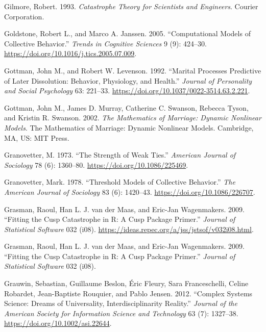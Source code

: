 \documentclass[
  letterpaper,
]{scrbook}
\newlength{\cslhangindent}
\newlength{\cslentryspacingunit} %
\newenvironment{CSLReferences}[2] %
 {%
  \setlength{\parindent}{0pt}
  \ifodd #1
  \let\oldpar\par
  \def\par{\hangindent=\cslhangindent\oldpar}
  \fi
  \setlength{\parskip}{#2\cslentryspacingunit}
 }%
 {}
\begin{document}
\begin{CSLReferences}{1}{0}
\leavevmode{}%
Gilmore, Robert. 1993. \emph{Catastrophe {Theory} for {Scientists} and
{Engineers}}. {Courier Corporation}.

\leavevmode{}%
Goldstone, Robert L., and Marco A. Janssen. 2005. {``Computational
Models of Collective Behavior.''} \emph{Trends in Cognitive Sciences} 9
(9): 424--30. \url{https://doi.org/10.1016/j.tics.2005.07.009}.

\leavevmode{}%
Gottman, John M., and Robert W. Levenson. 1992. {``Marital Processes
Predictive of Later Dissolution: {Behavior}, Physiology, and Health.''}
\emph{Journal of Personality and Social Psychology} 63: 221--33.
\url{https://doi.org/10.1037/0022-3514.63.2.221}.

\leavevmode{}%
Gottman, John M., James D. Murray, Catherine C. Swanson, Rebecca Tyson,
and Kristin R. Swanson. 2002. \emph{The Mathematics of Marriage:
{Dynamic} Nonlinear Models}. The Mathematics of Marriage: {Dynamic}
Nonlinear Models. {Cambridge, MA, US}: {MIT Press}.

\leavevmode{}%
Granovetter, M. 1973. {``The Strength of Weak Ties.''} \emph{American
Journal of Sociology} 78 (6): 1360--80.
\url{https://doi.org/10.1086/225469}.

\leavevmode{}%
Granovetter, Mark. 1978. {``Threshold {Models} of {Collective
Behavior}.''} \emph{The American Journal of Sociology} 83 (6): 1420--43.
\url{https://doi.org/10.1086/226707}.

\leavevmode{}%
Grasman, Raoul, Han L. J. van der Maas, and Eric-Jan Wagenmakers. 2009.
{``Fitting the Cusp Catastrophe in R: A Cusp Package Primer.''}
\emph{Journal of Statistical Software} 032 (i08).
\url{https://ideas.repec.org/a/jss/jstsof/v032i08.html}.

\leavevmode{}%
Grasman, Raoul, Han L. J. van der Maas, and Eric-Jan Wagenmakers. 2009.
{``Fitting the {Cusp Catastrophe} in {R}: {A} Cusp {Package Primer}.''}
\emph{Journal of Statistical Software} 032 (i08).

\leavevmode{}%
Grauwin, Sebastian, Guillaume Beslon, Éric Fleury, Sara Franceschelli,
Celine Robardet, Jean-Baptiste Rouquier, and Pablo Jensen. 2012.
{``Complex Systems Science: {Dreams} of Universality,
Interdisciplinarity Reality.''} \emph{Journal of the American Society
for Information Science and Technology} 63 (7): 1327--38.
\url{https://doi.org/10.1002/asi.22644}.


\end{CSLReferences}
\end{document}
